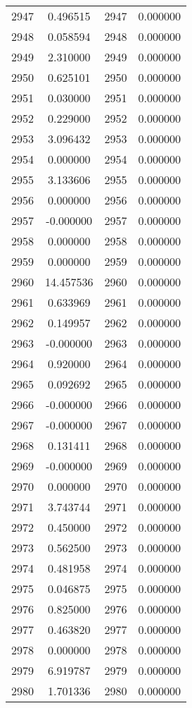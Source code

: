 \documentclass[12pt]{article}
\begin{document}
\begin{longtable}{@{}cccc@{}}
2947 & 0.496515 & 2947 & 0.000000 \\
2948 & 0.058594 & 2948 & 0.000000 \\
2949 & 2.310000 & 2949 & 0.000000 \\
2950 & 0.625101 & 2950 & 0.000000 \\
2951 & 0.030000 & 2951 & 0.000000 \\
2952 & 0.229000 & 2952 & 0.000000 \\
2953 & 3.096432 & 2953 & 0.000000 \\
2954 & 0.000000 & 2954 & 0.000000 \\
2955 & 3.133606 & 2955 & 0.000000 \\
2956 & 0.000000 & 2956 & 0.000000 \\
2957 & -0.000000 & 2957 & 0.000000 \\
2958 & 0.000000 & 2958 & 0.000000 \\
2959 & 0.000000 & 2959 & 0.000000 \\
2960 & 14.457536 & 2960 & 0.000000 \\
2961 & 0.633969 & 2961 & 0.000000 \\
2962 & 0.149957 & 2962 & 0.000000 \\
2963 & -0.000000 & 2963 & 0.000000 \\
2964 & 0.920000 & 2964 & 0.000000 \\
2965 & 0.092692 & 2965 & 0.000000 \\
2966 & -0.000000 & 2966 & 0.000000 \\
2967 & -0.000000 & 2967 & 0.000000 \\
2968 & 0.131411 & 2968 & 0.000000 \\
2969 & -0.000000 & 2969 & 0.000000 \\
2970 & 0.000000 & 2970 & 0.000000 \\
2971 & 3.743744 & 2971 & 0.000000 \\
2972 & 0.450000 & 2972 & 0.000000 \\
2973 & 0.562500 & 2973 & 0.000000 \\
2974 & 0.481958 & 2974 & 0.000000 \\
2975 & 0.046875 & 2975 & 0.000000 \\
2976 & 0.825000 & 2976 & 0.000000 \\
2977 & 0.463820 & 2977 & 0.000000 \\
2978 & 0.000000 & 2978 & 0.000000 \\
2979 & 6.919787 & 2979 & 0.000000 \\
2980 & 1.701336 & 2980 & 0.000000 \\

\end{longtable}
\end{document}
